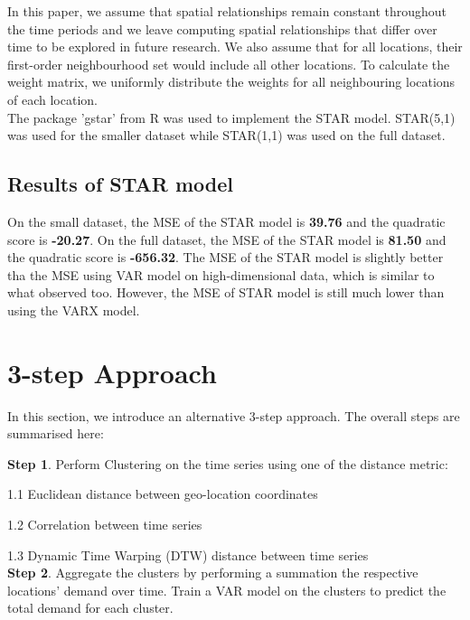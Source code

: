 \documentclass[nonblindrev,msom]{informs3} %
\begin{document}
\noindent In this paper, we assume that spatial relationships remain constant throughout the time periods and we leave computing spatial relationships that differ over time to be explored in future research. We also assume that for all locations, their first-order neighbourhood set would include all other locations. To calculate the weight matrix, we uniformly distribute the weights for all neighbouring locations of each location. \\

\noindent The package 'gstar' from R was used to implement the STAR model. STAR(5,1) was used for the smaller dataset while STAR(1,1) was used on the full dataset.

\subsection{Results of STAR model}

On the small dataset, the MSE of the STAR model is \textbf{39.76} and the quadratic score is \textbf{-20.27}. On the full dataset, the MSE of the STAR model is \textbf{81.50} and the quadratic score is \textbf{-656.32}. The MSE of the STAR model is slightly better tha the MSE using VAR model on high-dimensional data, which is similar to what \cite{Abolfazl2017} observed too. However, the MSE of STAR model is still much lower than using the VARX model. 

\section{3-step Approach}

In this section, we introduce an alternative 3-step approach. The overall steps are summarised here:

\noindent \textbf{Step 1}. Perform Clustering on the time series using one of the distance metric: 

	1.1 Euclidean distance between geo-location coordinates
	
	1.2 Correlation between time series 
	
	1.3 Dynamic Time Warping (DTW) distance between time series \\
	
	
	
\noindent \textbf{Step 2}. Aggregate the clusters by performing a summation the respective locations' demand over time. Train a VAR model on the clusters to predict the total demand for each cluster. \\
\end{document}
